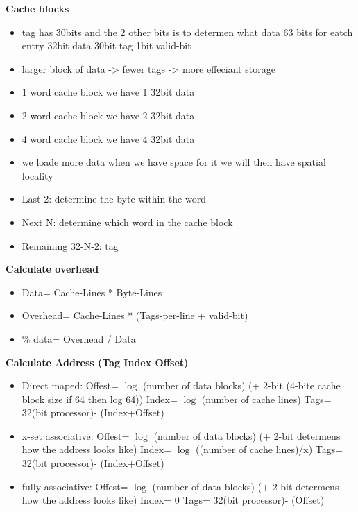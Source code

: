 \textbf{Cache blocks}
\begin{itemize}
\item tag has 30bits and the 2 other bits is to determen what data
  63 bits for eatch entry 32bit data 30bit tag 1bit valid-bit 
\item larger block of data -> fewer tags -> more effeciant storage
\item 1 word cache block we have 1 32bit data
\item 2 word cache block we have 2 32bit data 
\item 4 word cache block we have 4 32bit data
\item we loade more data when we have space for it
  we will then have spatial locality
\item Last 2: determine the byte within the word   
\item Next N: determine which word in the cache block 
\item Remaining 32-N-2: tag
\end{itemize}

\textbf{Calculate overhead}
\begin{itemize}
\item  Data= Cache-Lines * Byte-Lines
\item  Overhead= Cache-Lines * (Tags-per-line + valid-bit)
\item  \% data=  Overhead / Data
\end{itemize}

\textbf{Calculate Address (Tag Index Offset)} %
\begin{itemize}
\item  Direct maped: \newline
  Offest= $\log$ (number of data blocks)  (+ 2-bit (4-bite cache block size if 64 then log 64)) \newline
  Index= $\log$ (number of cache lines) \newline
  Tags= 32(bit processor)- (Index+Offset) 
\item  x-set associative: \newline
  Offest= $\log$ (number of data blocks)  (+ 2-bit determens how the address looks like) \newline
  Index= $\log$ ((number of cache lines)/x) \newline
  Tags= 32(bit processor)- (Index+Offset)
\item  fully associative: \newline
  Offest= $\log$ (number of data blocks)  (+ 2-bit determens how the address looks like) \newline
  Index= 0 \newline
  Tags= 32(bit processor)- (Offset)
\end{itemize}

